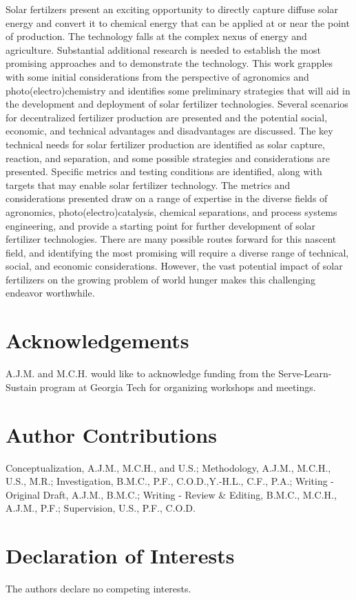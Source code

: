 Solar fertilzers present an exciting opportunity to directly capture diffuse solar energy and convert it to chemical energy that can be applied at or near the point of production. The technology falls at the complex nexus of energy and agriculture. Substantial additional research is needed to establish the most promising approaches and to demonstrate the technology. This work grapples with some initial considerations from the perspective of agronomics and photo(electro)chemistry and identifies some preliminary strategies that will aid in the development and deployment of solar fertilizer technologies. Several scenarios for decentralized fertilizer production are presented and the potential social, economic, and technical advantages and disadvantages are discussed. The key technical needs for solar fertilizer production are identified as solar capture, reaction, and separation, and some possible strategies and considerations are presented. Specific metrics and testing conditions are identified, along with targets that may enable solar fertilizer technology. The metrics and considerations presented draw on a range of expertise in the diverse fields of agronomics, photo(electro)catalysis, chemical separations, and process systems engineering, and provide a starting point for further development of solar fertilizer technologies. There are many possible routes forward for this nascent field, and identifying the most promising will require a diverse range of technical, social, and economic considerations. However, the vast potential impact of solar fertilizers on the growing problem of world hunger makes this challenging endeavor worthwhile.

\section*{Acknowledgements}
A.J.M. and M.C.H. would like to acknowledge funding from the Serve-Learn-Sustain program at Georgia Tech for organizing workshops and meetings.

\section*{Author Contributions}
Conceptualization, A.J.M., M.C.H., and U.S.; Methodology, A.J.M., M.C.H., U.S., M.R.; Investigation, B.M.C., P.F., C.O.D.,Y.-H.L., C.F., P.A.; Writing - Original Draft, A.J.M., B.M.C.; Writing - Review \& Editing, B.M.C., M.C.H., A.J.M., P.F.; Supervision, U.S., P.F., C.O.D. 

\section*{Declaration of Interests}
The authors declare no competing interests.

